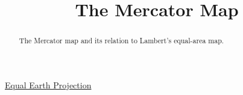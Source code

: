 \documentclass{ximera}
\title{The Mercator Map}
\begin{document}
\begin{abstract}
The Mercator map and its relation to Lambert's equal-area map.
\end{abstract}
\maketitle

\href{https://www.nytimes.com/2025/08/19/world/africa/africa-map-mercator.html}{Equal Earth Projection}
\end{document}
